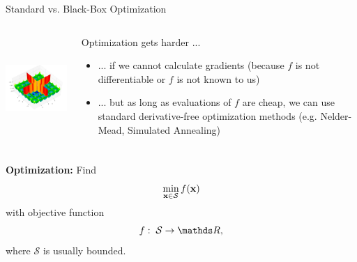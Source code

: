 \documentclass[11pt,compress,t,notes=noshow, xcolor=table]{beamer}
\begin{document}
\begin{vbframe}{Standard vs. Black-Box Optimization}
\begin{columns}
\begin{column}{0.4\textwidth}
\begin{center}
\includegraphics[height = 4cm]{figure_man/cross-in-tray.jpg}
\end{center}
\end{column}
\begin{column}{0.59\textwidth}
Optimization gets harder ...
\begin{itemize}
\item ... if we cannot calculate gradients (because $f$ is not differentiable or $f$ is not known to us)
\item ... but as long as evaluations of $f$ are cheap, we can use standard derivative-free optimization methods (e.g. Nelder-Mead, Simulated Annealing)
\end{itemize}
\end{column}
\end{columns}

\framebreak 

\textbf{Optimization: } Find
$$
\min_{\mathbf{x} \in \mathcal{S}} f(\mathbf{x})
$$
with objective function
$$
f: \; \mathcal{S} \to \R,
$$
where $\mathcal{S}$ is usually bounded.

\lz 

\begin{columns}
\begin{column}{0.4\textwidth}

\vspace*{-0.8cm}




\end{column}
\end{columns}
\end{vbframe}
\end{document}
